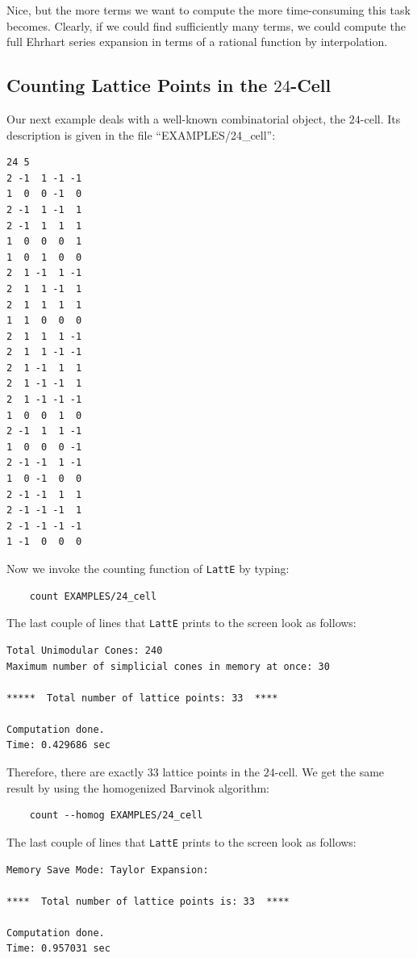 \documentclass{article}
\begin{document}
Nice, but the more terms we want to compute the more time-consuming
this task becomes. Clearly, if we could find sufficiently many
terms, we could compute the full Ehrhart series expansion in terms of
a rational function by interpolation.

\subsection{Counting Lattice Points in the $24$-Cell}
Our next example deals with a well-known combinatorial object, the
$24$-cell. Its description is given in the file ``EXAMPLES/24\_cell'':
\begin{verbatim}
24 5 
2 -1  1 -1 -1
1  0  0 -1  0
2 -1  1 -1  1
2 -1  1  1  1
1  0  0  0  1
1  0  1  0  0
2  1 -1  1 -1
2  1  1 -1  1
2  1  1  1  1
1  1  0  0  0
2  1  1  1 -1
2  1  1 -1 -1
2  1 -1  1  1
2  1 -1 -1  1
2  1 -1 -1 -1
1  0  0  1  0
2 -1  1  1 -1
1  0  0  0 -1
2 -1 -1  1 -1
1  0 -1  0  0
2 -1 -1  1  1
2 -1 -1 -1  1
2 -1 -1 -1 -1
1 -1  0  0  0
\end{verbatim}
Now we invoke the counting function of {\tt LattE} by typing:
\begin{verbatim}
    count EXAMPLES/24_cell
\end{verbatim}
The last couple of lines that {\tt LattE} prints to the screen
look as follows:
\begin{verbatim}
Total Unimodular Cones: 240
Maximum number of simplicial cones in memory at once: 30

*****  Total number of lattice points: 33  ****

Computation done. 
Time: 0.429686 sec
\end{verbatim}
Therefore, there are exactly $33$ lattice points in the $24$-cell. We
get the same result by using the homogenized Barvinok algorithm:
\begin{verbatim}
    count --homog EXAMPLES/24_cell
\end{verbatim}
The last couple of lines that {\tt LattE} prints to the screen
look as follows:
\begin{verbatim}
Memory Save Mode: Taylor Expansion:

****  Total number of lattice points is: 33  ****

Computation done. 
Time: 0.957031 sec
\end{verbatim}

\end{document}
